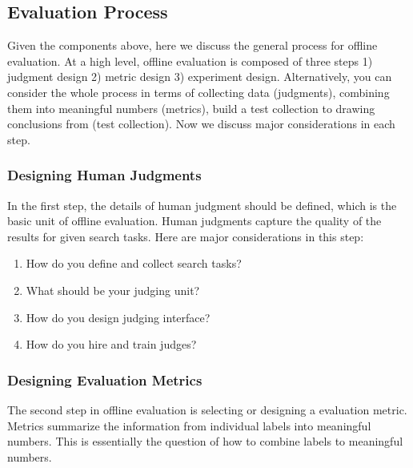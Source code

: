 \subsection{Evaluation Process}
Given the components above, here we discuss the general process for offline evaluation. At a high level, offline evaluation is composed of three steps 1) judgment design 2) metric design 3) experiment design. Alternatively, you can consider the whole process in terms of collecting data (judgments), combining them into meaningful numbers (metrics), build a test collection to drawing conclusions from (test collection). Now we discuss major considerations in each step.

\subsubsection{Designing Human Judgments}

In the first step, the details of human judgment should be defined, which is the basic unit of offline evaluation. Human judgments capture the quality of the results for given search tasks. Here are major considerations in this step:

\begin{enumerate}
	\item How do you define and collect search tasks?
	\item What should be your judging unit?
	\item How do you design judging interface?
	\item How do you hire and train judges?
\end{enumerate}

\subsubsection{Designing Evaluation Metrics}

The second step in offline evaluation is selecting or designing a  evaluation metric. Metrics summarize the information from individual labels into meaningful numbers. This is essentially the question of how to combine labels to meaningful numbers.

